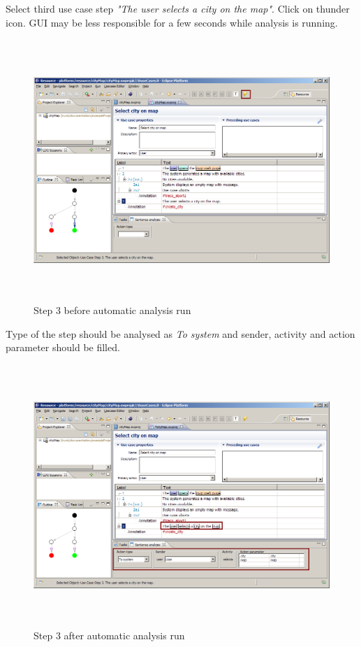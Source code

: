 Select third use case step \emph{"The user selects a city on the map"}. Click on thunder icon.
GUI may be less responsible for a few seconds while analysis is running.

\begin{figure}[ht]
  \centering
  \includegraphics[height=280pt]{images/manual-analysis/step3-automatic-before}
  \caption{Step 3 before automatic analysis run}
\end{figure}

Type of the step should be analysed as \emph{To system} and sender, activity and action parameter
should be filled.

\begin{figure}[ht]
  \centering
  \includegraphics[height=280pt]{images/manual-analysis/step3-automatic-after}
  \caption{Step 3 after automatic analysis run}
\end{figure}


